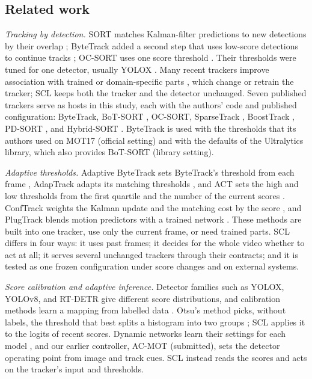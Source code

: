 \documentclass[pdflatex,sn-mathphys-num,iicol]{sn-jnl}
\newcommand{\scl}{SCL}
\begin{document}
\subsection{Related work}\label{sec:survey}
\emph{Tracking by detection.}\label{sec:hosts} SORT matches Kalman-filter predictions to new
detections by their overlap \cite{bewley2016sort}; ByteTrack added a second step that uses
low-score detections to continue tracks \cite{zhang2022bytetrack}; OC-SORT uses one score
threshold \cite{cao2023ocsort}. Their thresholds were tuned for one detector, usually YOLOX
\cite{ge2021yolox}. Many recent trackers improve association with trained or domain-specific
parts \cite{li2024fdbtrack,bao2024graphmatching,zhang2025sinkhorn,ding2025remot,liang2024motiontrack,sun2026bsr},
which change or retrain the tracker; \scl{} keeps both the tracker and the detector unchanged.
Seven published trackers serve as hosts in this study, each with the authors' code and published
configuration: ByteTrack, BoT-SORT \cite{aharon2022botsort}, OC-SORT, SparseTrack
\cite{liu2025sparsetrack}, BoostTrack \cite{stanojevic2024boosttrack}, PD-SORT
\cite{wang2025pdsort}, and Hybrid-SORT \cite{yang2024hybridsort}. ByteTrack is used with the
thresholds that its authors used on MOT17 (official setting) and with the defaults of the
Ultralytics library, which also provides BoT-SORT (library setting).

\emph{Adaptive thresholds.} Adaptive ByteTrack sets ByteTrack's threshold from each frame
\cite{ma2023adaptivebytetrack}, AdapTrack adapts its matching thresholds \cite{shim2024adaptrack},
and ACT sets the high and low thresholds from the first quartile and the number of the current
scores \cite{act2026adaptive}. ConfTrack weights the Kalman update and the matching cost by the
score \cite{jung2024conftrack}, and PlugTrack blends motion predictors with a trained network
\cite{kim2026plugtrack}. These methods are built into one tracker, use only the current frame, or
need trained parts. \scl{} differs in four ways: it uses past frames; it decides for the whole video
whether to act at all; it serves several unchanged trackers through their contracts; and it is
tested as one frozen configuration under score changes and on external systems.

\emph{Score calibration and adaptive inference.} Detector families such as YOLOX, YOLOv8, and RT-DETR give different score distributions,
and calibration methods learn a mapping from labelled data \cite{kuppers2020detcalib}. Otsu's
method picks, without labels, the threshold that best splits a histogram into two groups
\cite{otsu1979}; \scl{} applies it to the logits of recent scores. Dynamic networks learn their
settings for each model \cite{han2022dynamic}, and our earlier controller, AC-MOT (submitted), sets the detector operating point from
image and track cues. \scl{} instead reads the scores and acts on the tracker's input and
thresholds.
\end{document}
